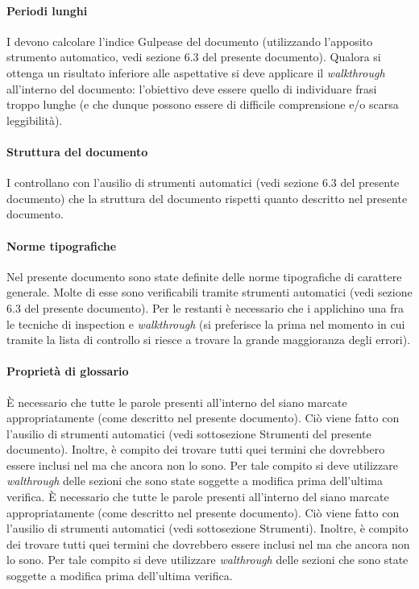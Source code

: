 			\paragraph{Periodi lunghi}
				I  devono calcolare l'indice Gulpease del documento (utilizzando l'apposito strumento automatico, vedi sezione 6.3 del presente documento). Qualora si ottenga un risultato inferiore alle aspettative si deve applicare il \textit{walkthrough} all'interno del documento: l'obiettivo deve essere quello di individuare frasi troppo lunghe (e che dunque possono essere di difficile comprensione e/o scarsa leggibilità).
			\paragraph{Struttura del documento}
				I  controllano con l'ausilio di strumenti automatici (vedi sezione 6.3 del presente documento) che la struttura del documento rispetti quanto descritto nel presente documento.
			\paragraph{Norme tipografiche}
				Nel presente documento sono state definite delle norme tipografiche di carattere generale. Molte di esse sono verificabili tramite strumenti automatici (vedi sezione 6.3 del presente documento). Per le restanti è necessario che i  applichino una fra le tecniche di inspection e \textit{walkthrough}	(si preferisce la prima nel momento in cui tramite la lista di controllo si riesce a trovare la grande maggioranza degli errori).
			\paragraph{Proprietà di glossario}
				È necessario che tutte le parole presenti all'interno del  siano marcate appropriatamente (come descritto nel presente 
				documento). Ciò viene fatto con l'ausilio di strumenti automatici (vedi sottosezione Strumenti del presente documento). Inoltre, è compito dei  trovare tutti quei termini che dovrebbero essere inclusi nel  ma che ancora non lo sono. Per tale compito si deve utilizzare \textit{walthrough} delle sezioni che sono state soggette a modifica prima dell'ultima verifica.
				È necessario che tutte le parole presenti all'interno del  siano marcate appropriatamente (come descritto nel presente documento). Ciò viene fatto con l'ausilio di strumenti automatici (vedi sottosezione Strumenti). Inoltre, è compito dei  trovare tutti quei termini che dovrebbero essere inclusi nel  ma che ancora non lo sono. Per tale compito si deve utilizzare \textit{walthrough} delle sezioni che sono state soggette a modifica prima dell'ultima verifica.
		

